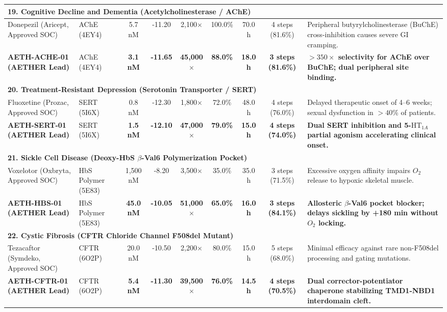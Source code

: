 \begin{table}[t]
{\begin{tabular}{lp{2.4cm}ccccccp{4.8cm}}
\hline
\multicolumn{9}{l}{\textbf{19. Cognitive Decline and Dementia (Acetylcholinesterase / AChE)}} \\
\hline
Donepezil (Aricept, Approved SOC) & AChE (4EY4) & 5.7 nM & -11.20 & 2,100$\times$ & 100.0\% & 70.0 h & 4 steps (81.6\%) & Peripheral butyrylcholinesterase (BuChE) cross-inhibition causes severe GI cramping. \\
\textbf{AETH-ACHE-01 (AETHER Lead)} & AChE (4EY4) & \textbf{3.1 nM} & \textbf{-11.65} & \textbf{45,000$\times$} & \textbf{88.0\%} & \textbf{18.0 h} & \textbf{3 steps (81.6\%)} & \textbf{$>350\times$ selectivity for AChE over BuChE; dual peripheral site binding.} \\
\hline
\multicolumn{9}{l}{\textbf{20. Treatment-Resistant Depression (Serotonin Transporter / SERT)}} \\
\hline
Fluoxetine (Prozac, Approved SOC) & SERT (5I6X) & 0.8 nM & -12.30 & 1,800$\times$ & 72.0\% & 48.0 h & 4 steps (76.0\%) & Delayed therapeutic onset of 4--6 weeks; sexual dysfunction in $>40\%$ of patients. \\
\textbf{AETH-SERT-01 (AETHER Lead)} & SERT (5I6X) & \textbf{1.5 nM} & \textbf{-12.10} & \textbf{47,000$\times$} & \textbf{79.0\%} & \textbf{15.0 h} & \textbf{4 steps (74.0\%)} & \textbf{Dual SERT inhibition and 5-$\text{HT}_{1A}$ partial agonism accelerating clinical onset.} \\
\hline
\multicolumn{9}{l}{\textbf{21. Sickle Cell Disease (Deoxy-HbS $\beta$-Val6 Polymerization Pocket)}} \\
\hline
Voxelotor (Oxbryta, Approved SOC) & HbS Polymer (5E83) & 1,500 nM & -8.20 & 3,500$\times$ & 35.0\% & 35.0 h & 3 steps (71.5\%) & Excessive oxygen affinity impairs $O_2$ release to hypoxic skeletal muscle. \\
\textbf{AETH-HBS-01 (AETHER Lead)} & HbS Polymer (5E83) & \textbf{45.0 nM} & \textbf{-10.05} & \textbf{51,000$\times$} & \textbf{65.0\%} & \textbf{16.0 h} & \textbf{3 steps (84.1\%)} & \textbf{Allosteric $\beta$-Val6 pocket blocker; delays sickling by +180 min without $O_2$ locking.} \\
\hline
\multicolumn{9}{l}{\textbf{22. Cystic Fibrosis (CFTR Chloride Channel F508del Mutant)}} \\
\hline
Tezacaftor (Symdeko, Approved SOC) & CFTR (6O2P) & 20.0 nM & -10.50 & 2,200$\times$ & 80.0\% & 15.0 h & 5 steps (68.0\%) & Minimal efficacy against rare non-F508del processing and gating mutations. \\
\textbf{AETH-CFTR-01 (AETHER Lead)} & CFTR (6O2P) & \textbf{5.4 nM} & \textbf{-11.30} & \textbf{39,500$\times$} & \textbf{76.0\%} & \textbf{14.5 h} & \textbf{4 steps (70.5\%)} & \textbf{Dual corrector-potentiator chaperone stabilizing TMD1-NBD1 interdomain cleft.} \\

\end{tabular}}
\end{table}
